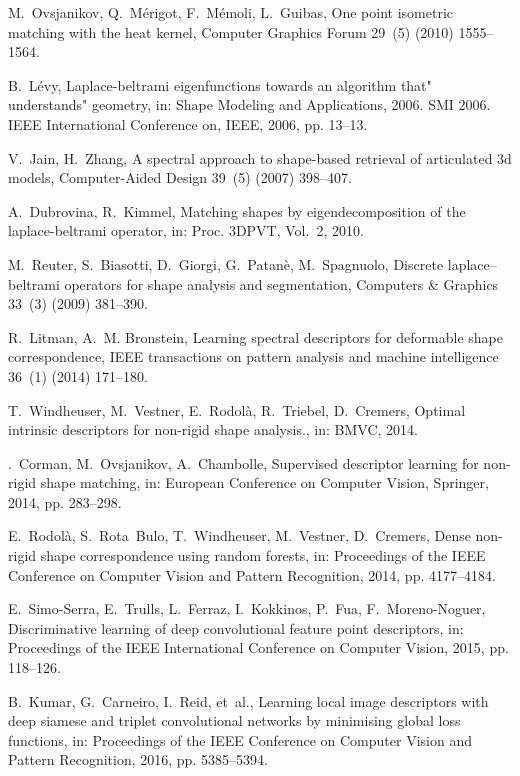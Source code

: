 \documentclass[5p,twocolumn,10pt,times]{elsarticle}
\begin{document}
\begin{thebibliography}{10}
M.~Ovsjanikov, Q.~M{\'e}rigot, F.~M{\'e}moli, L.~Guibas, One point isometric
  matching with the heat kernel, Computer Graphics Forum 29~(5) (2010)
  1555--1564.

B.~L{\'e}vy, Laplace-beltrami eigenfunctions towards an algorithm that"
  understands" geometry, in: Shape Modeling and Applications, 2006. SMI 2006.
  IEEE International Conference on, IEEE, 2006, pp. 13--13.

V.~Jain, H.~Zhang, A spectral approach to shape-based retrieval of articulated
  3d models, Computer-Aided Design 39~(5) (2007) 398--407.

A.~Dubrovina, R.~Kimmel, Matching shapes by eigendecomposition of the
  laplace-beltrami operator, in: Proc. 3DPVT, Vol.~2, 2010.

M.~Reuter, S.~Biasotti, D.~Giorgi, G.~Patan{\`e}, M.~Spagnuolo, Discrete
  laplace--beltrami operators for shape analysis and segmentation, Computers \&
  Graphics 33~(3) (2009) 381--390.

R.~Litman, A.~M. Bronstein, Learning spectral descriptors for deformable shape
  correspondence, IEEE transactions on pattern analysis and machine
  intelligence 36~(1) (2014) 171--180.

T.~Windheuser, M.~Vestner, E.~Rodol{\`a}, R.~Triebel, D.~Cremers, Optimal
  intrinsic descriptors for non-rigid shape analysis., in: BMVC, 2014.

.~Corman, M.~Ovsjanikov, A.~Chambolle, Supervised descriptor learning for
  non-rigid shape matching, in: European Conference on Computer Vision,
  Springer, 2014, pp. 283--298.

E.~Rodol{\`a}, S.~Rota~Bulo, T.~Windheuser, M.~Vestner, D.~Cremers, Dense
  non-rigid shape correspondence using random forests, in: Proceedings of the
  IEEE Conference on Computer Vision and Pattern Recognition, 2014, pp.
  4177--4184.

E.~Simo-Serra, E.~Trulls, L.~Ferraz, I.~Kokkinos, P.~Fua, F.~Moreno-Noguer,
  Discriminative learning of deep convolutional feature point descriptors, in:
  Proceedings of the IEEE International Conference on Computer Vision, 2015,
  pp. 118--126.

B.~Kumar, G.~Carneiro, I.~Reid, et~al., Learning local image descriptors with
  deep siamese and triplet convolutional networks by minimising global loss
  functions, in: Proceedings of the IEEE Conference on Computer Vision and
  Pattern Recognition, 2016, pp. 5385--5394.


\end{thebibliography}
\end{document}
